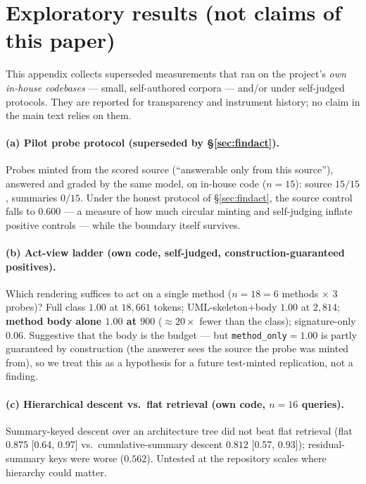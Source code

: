 \documentclass{article}
\newcommand{\ci}[2]{[#1, #2]}
\begin{document}
\section{Exploratory results (not claims of this paper)}
\label{app:explore}

This appendix collects superseded measurements that ran on the project's \emph{own in-house
codebases} --- small, self-authored corpora --- and/or under self-judged protocols. They are
reported for transparency and instrument history; no claim in the main text relies on them.

\paragraph{(a) Pilot probe protocol (superseded by \S\ref{sec:findact}).} Probes minted from the
scored source (``answerable only from this source''), answered and graded by the same model, on
in-house code ($n{=}15$): source $15/15$, summaries $0/15$. Under the honest protocol of
\S\ref{sec:findact}, the source control falls to $0.600$ --- a measure of how much circular
minting and self-judging inflate positive controls --- while the boundary itself survives.

\paragraph{(b) Act-view ladder (own code, self-judged, construction-guaranteed positives).}
Which rendering suffices to act on a single method ($n{=}18 = 6$ methods $\times$ 3 probes)?
Full class $1.00$ at $18{,}661$ tokens; UML-skeleton$+$body $1.00$ at $2{,}814$; \textbf{method
body alone $1.00$ at $900$} (${\approx}20\times$ fewer than the class); signature-only $0.06$.
Suggestive that the body is the budget --- but \texttt{method\_only}$=1.00$ is partly guaranteed
by construction (the answerer sees the source the probe was minted from), so we treat this as a
hypothesis for a future test-minted replication, not a finding.

\paragraph{(c) Hierarchical descent vs.\ flat retrieval (own code, $n{=}16$ queries).}
Summary-keyed descent over an architecture tree did not beat flat retrieval (flat $0.875$
\ci{0.64}{0.97} vs.\ cumulative-summary descent $0.812$ \ci{0.57}{0.93}); residual-summary keys
were worse ($0.562$). Untested at the repository scales where hierarchy could matter.
\end{document}
